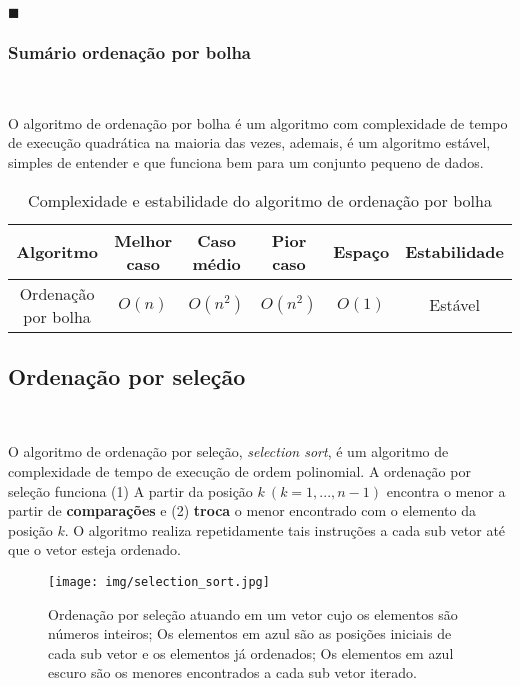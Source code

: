 {\raggedleft $\blacksquare $ \par}


\subsubsection{Sumário ordenação por bolha}
\ 

O algoritmo de ordenação por bolha é um algoritmo com complexidade de tempo de execução quadrática na maioria das vezes, ademais, é um algoritmo estável, simples de entender e que funciona bem para um conjunto pequeno de dados.

\begin{table}[h]
  \centering
  \label{tab:bubble-sort}
  \begin{tabular}{|c|c|c|c|c|c|}
    \hline
    \textbf{Algoritmo} & \textbf{Melhor caso} & \textbf{Caso médio} & \textbf{Pior caso} & \textbf{Espaço}& \textbf{Estabilidade} \\ \hline
    Ordenação por bolha       & \( O(n) \)           & \( O(n^2) \)         & \( O(n^2) \)        & \(O(1)\) & Estável               \\ \hline
  \end{tabular}
  \caption{Complexidade e estabilidade do algoritmo de ordenação por bolha}
\end{table}

\newpage

\subsection{Ordenação por seleção}
\ 

O algoritmo de ordenação por seleção, \textit{selection sort}, é um algoritmo de complexidade de tempo de execução de ordem polinomial. A ordenação por seleção funciona (1) A partir da posição $k \ (k=1,...,n-1)$ encontra o menor a partir de \textbf{comparações} e (2) \textbf{troca} o menor encontrado com o elemento da posição $k$. O algoritmo realiza repetidamente tais instruções a cada sub vetor até que o vetor esteja ordenado.

\begin{figure}[h]
  \centering
  \texttt{[image: img/selection\_sort.jpg]}
  \caption{Ordenação por seleção atuando em um vetor cujo os elementos são números inteiros; Os elementos em azul são as posições iniciais de cada sub vetor e os elementos já ordenados; Os elementos em azul escuro são os menores encontrados a cada sub vetor iterado.}
  \label{selection_sort}
\end{figure}

